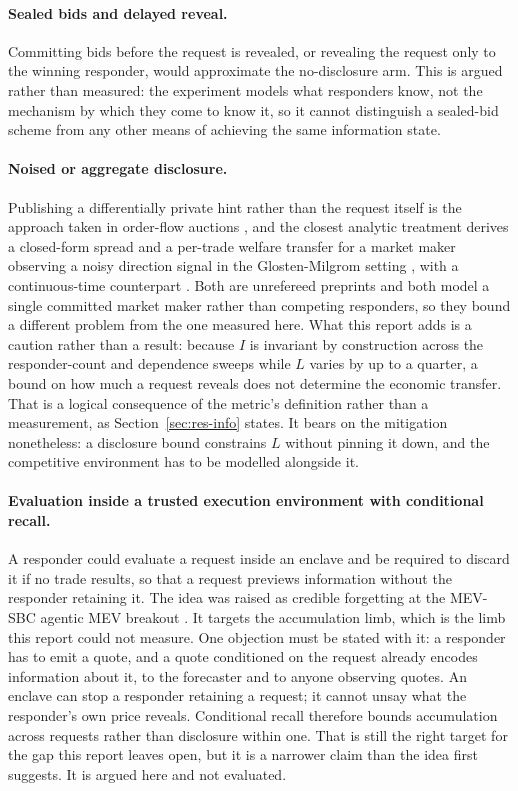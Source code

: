 \paragraph{Sealed bids and delayed reveal.} Committing bids before the request is revealed,
or revealing the request only to the winning responder, would approximate the no-disclosure
arm. This is argued rather than measured: the experiment models what responders know, not
the mechanism by which they come to know it, so it cannot distinguish a sealed-bid scheme
from any other means of achieving the same information state.

\paragraph{Noised or aggregate disclosure.} Publishing a differentially private hint rather
than the request itself is the approach taken in order-flow auctions
\cite{passeratpalmbach2025dphints}, and the closest analytic treatment derives a closed-form
spread and a per-trade welfare transfer for a market maker observing a noisy direction signal
in the Glosten-Milgrom setting \cite{nakamura2026privacysubsidy}, with a continuous-time
counterpart \cite{nakamura2026kyle}. Both are unrefereed preprints and both model a single
committed market maker rather than competing responders, so they bound a different problem
from the one measured here. What this report adds is a caution rather than a
result: because $I$ is invariant by construction across the responder-count and dependence
sweeps while $L$ varies by up to a quarter, a bound on how much a request reveals does not
determine the economic transfer. That is a logical consequence of the metric's definition
rather than a measurement, as Section~\ref{sec:res-info} states. It bears on the mitigation
nonetheless: a disclosure bound constrains $L$ without pinning it down, and the competitive
environment has to be modelled alongside it.

\paragraph{Evaluation inside a trusted execution environment with conditional recall.} A
responder could evaluate a request inside an enclave and be required to discard it if no
trade results, so that a request previews information without the responder retaining it.
The idea was raised as credible forgetting at the MEV-SBC agentic MEV breakout
\cite{mevsbc2026breakout}. It targets the accumulation limb, which is the limb this report
could not measure. One objection must be stated with it: a responder has to emit a quote,
and a quote conditioned on the request already encodes information about it, to the
forecaster and to anyone observing quotes. An enclave can stop a responder retaining a
request; it cannot unsay what the responder's own price reveals. Conditional recall
therefore bounds accumulation across requests rather than disclosure within one. That is
still the right target for the gap this report leaves open, but it is a narrower claim than
the idea first suggests. It is argued here and not evaluated.

